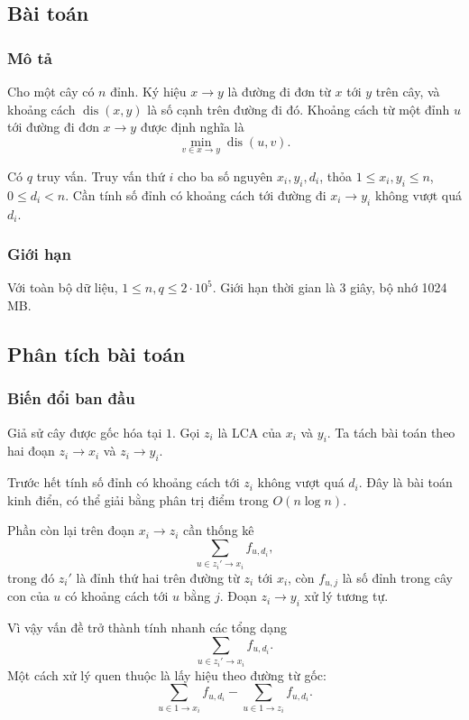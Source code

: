\documentclass[11pt]{article}
\begin{document}
\subsection{Bài toán}

\subsubsection{Mô tả}

Cho một cây có \(n\) đỉnh. Ký hiệu \(x\to y\) là đường đi đơn từ \(x\) tới
\(y\) trên cây, và khoảng cách \(\operatorname{dis}(x,y)\) là số cạnh trên
đường đi đó. Khoảng cách từ một đỉnh \(u\) tới đường đi đơn \(x\to y\) được
định nghĩa là
\[
  \min_{v\in x\to y}\operatorname{dis}(u,v).
\]

Có \(q\) truy vấn. Truy vấn thứ \(i\) cho ba số nguyên \(x_i,y_i,d_i\), thỏa
\(1\le x_i,y_i\le n\), \(0\le d_i<n\). Cần tính số đỉnh có khoảng cách tới
đường đi \(x_i\to y_i\) không vượt quá \(d_i\).

\subsubsection{Giới hạn}

Với toàn bộ dữ liệu, \(1\le n,q\le 2\cdot 10^5\). Giới hạn thời gian là
3 giây, bộ nhớ 1024 MB.

\subsection{Phân tích bài toán}

\subsubsection{Biến đổi ban đầu}

Giả sử cây được gốc hóa tại \(1\). Gọi \(z_i\) là LCA của \(x_i\) và \(y_i\).
Ta tách bài toán theo hai đoạn \(z_i\to x_i\) và \(z_i\to y_i\).

Trước hết tính số đỉnh có khoảng cách tới \(z_i\) không vượt quá \(d_i\). Đây
là bài toán kinh điển, có thể giải bằng phân trị điểm trong \(O(n\log n)\).

Phần còn lại trên đoạn \(x_i\to z_i\) cần thống kê
\[
  \sum_{u\in z_i'\to x_i} f_{u,d_i},
\]
trong đó \(z_i'\) là đỉnh thứ hai trên đường từ \(z_i\) tới \(x_i\), còn
\(f_{u,j}\) là số đỉnh trong cây con của \(u\) có khoảng cách tới \(u\) bằng
\(j\). Đoạn \(z_i\to y_i\) xử lý tương tự.

Vì vậy vấn đề trở thành tính nhanh các tổng dạng
\[
  \sum_{u\in z_i'\to x_i} f_{u,d_i}.
\]
Một cách xử lý quen thuộc là lấy hiệu theo đường từ gốc:
\[
  \sum_{u\in 1\to x_i} f_{u,d_i}
  -
  \sum_{u\in 1\to z_i} f_{u,d_i}.
\]
\end{document}
